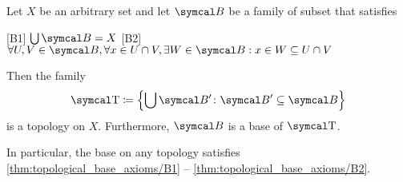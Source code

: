 \begin{proposition}\label{thm:topological_base_axioms}\cite[12]{Engelking1989}
  Let \( X \) be an arbitrary set and let \( \Cal{B} \) be a family of subset that satisfies
  \begin{description}
    [B1] \( \bigcup \Cal{B} = X \)
    [B2] \( \forall U, V \in \Cal{B}, \forall x \in U \cap V, \exists W \in \Cal{B}: x \in W \subseteq U \cap V \)
  \end{description}

  Then the family
  \begin{align}\label{thm:topological_base_axioms/topology}
    \CT \coloneqq \left\{ \bigcup \Cal{B}' \colon \Cal{B}' \subseteq \Cal{B} \right\}
  \end{align}
  is a topology on \( X \). Furthermore, \( \Cal{B} \) is a base of \( \CT \).

  In particular, the base on any topology satisfies \cref{thm:topological_base_axioms/B1} -- \cref{thm:topological_base_axioms/B2}.
\end{proposition}
